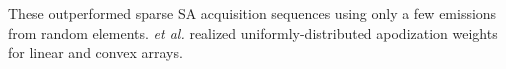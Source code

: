 These outperformed
sparse \ac{SA} acquisition sequences using
only a few emissions from
random elements.
 \emph{et al.} \cite{article:LiuITUFFC2018,article:LiuITMI2017} realized
uniformly-distributed apodization weights for
linear and convex arrays.
